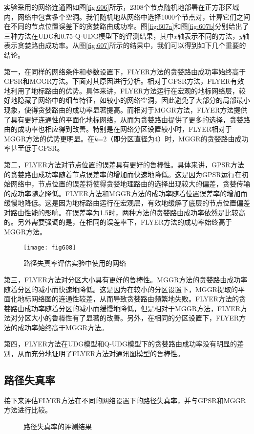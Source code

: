 实验采用的网络连通图如图\ref{fig:606}所示，2308个节点随机地部署在正方形区域内，网络中包含多个空洞。我们随机地从网络中选择1000个节点对，计算它们之间在不同的节点位置误差下的贪婪路由成功率。图\ref{fig:607a}和图\ref{fig:607b}分别给出了三种方法在UDG和0.75-Q-UDG模型下的评测结果，其中$x$轴表示不同的方法，$y$轴表示贪婪路由成功率。从图\ref{fig:607}所示的结果中，我们可以得到如下几个重要的结论。

第一，在同样的网络条件和参数设置下，FLYER方法的贪婪路由成功率始终高于GPSR和MGGR方法。下面对其原因进行分析。相对于GPSR方法，FLYER有效地利用了地标路由的优势。具体来讲，FLYER方法运行在宏观的地标网络层，较好地隐藏了网络中的细节特征，如较小的网络空洞，因此避免了大部分的局部最小现象，使得贪婪路由的成功率显著提高。而相对于MGGR方法，FLYER方法提供了具有更好连通性的平面化地标网络，从而为贪婪路由提供了更多的选择，贪婪路由的成功率也相应得到改善。特别是在网络分区设置较小时，FLYER相对于MGGR方法的优势更明显。在$k$=2（即分区直径为4）时，MGGR的贪婪路由成功率甚至低于GPSR。

第二，FLYER方法对节点位置的误差具有更好的鲁棒性。具体来讲，GPSR方法的贪婪路由成功率随着节点误差率的增加而快速地降低。这是因为GPSR运行在初始网络中，节点位置的误差将使得贪婪地理路由的选择出现较大的偏差，贪婪传输的成功率随之降低。FLYER方法和MGGR方法的成功率随着位置误差率的增加而缓慢地降低。这是因为地标路由运行在宏观层，有效地缓解了底层的节点位置偏差对路由性能的影响。在误差率为1.5时，两种方法的贪婪路由成功率依然是比较高的。另外需要强调的是，在相同的误差率下，FLYER方法的成功率始终高于MGGR方法。
\begin{figure}[t]
\centering
\texttt{[image: fig608]}
\caption{路径失真率评估实验中使用的网络}
\label{fig:608}
\end{figure}

第三，FLYER方法对分区大小具有更好的鲁棒性。MGGR方法的贪婪路由成功率随着分区的减小而快速地降低。这是因为在较小的分区设置下，MGGR提取的平面化地标网络图的连通性较差，从而导致贪婪路由频繁地失败。FLYER方法的贪婪路由成功率随着分区的减小而缓慢地降低，但是相对于MGGR方法，FLYER方法对分区大小的鲁棒性有了显著的改善。另外，在相同的分区设置下，FLYER方法的成功率始终高于MGGR方法。

第四，FLYER方法在UDG模型和Q-UDG模型下的贪婪路由成功率没有明显的差别，从而充分地证明了FLYER方法对通讯图模型的鲁棒性。
\subsection{路径失真率}
接下来评估FLYER方法在不同的网络设置下的路径失真率，并与GPSR和MGGR方法进行比较。
\begin{figure}[t]
  \centering
  \hspace{2em}
  \caption{路径失真率的评测结果}
  \label{fig:609}
\end{figure}

